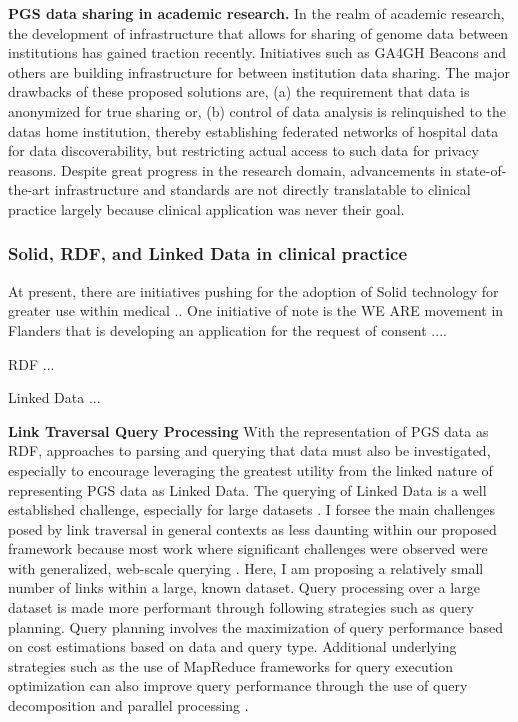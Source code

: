 \documentclass[runningheads]{llncs}
\begin{document}
\textbf{PGS data sharing in academic research.}
In the realm of academic research, the development of infrastructure that allows for sharing of genome data between institutions has gained traction recently. 
Initiatives such as GA4GH Beacons \cite{rambla_beacon_2022} and others are building infrastructure for between institution data sharing. 
The major drawbacks of these proposed solutions are, (a) the requirement that data is anonymized for true sharing or, (b) control of data analysis is relinquished to the data\textquotesingle s home institution, thereby establishing federated networks of hospital data for data discoverability, but restricting actual access to such data for privacy reasons.
Despite great progress in the research domain, advancements in state-of-the-art infrastructure and standards are not directly translatable to clinical practice largely because clinical application was never their goal. 

\subsubsection{Solid, RDF, and Linked Data in clinical practice}
At present, there are initiatives pushing for the adoption of Solid technology for greater use within medical ..
One initiative of note is the WE ARE movement in Flanders that is developing an application for the request of consent ....

RDF ...

Linked Data ...

\textbf{Link Traversal Query Processing}
With the representation of PGS data as RDF, approaches to parsing and querying that data must also be investigated, especially to encourage leveraging the greatest utility from the linked nature of representing PGS data as Linked Data.
The querying of Linked Data is a well established challenge, especially for large datasets \cite{taelman_evaluation_2023}.
I forsee the main challenges posed by link traversal in general contexts as less daunting within our proposed framework because most work where significant challenges were observed were with generalized, web-scale querying \cite{taelman_evaluation_2023}. 
Here, I am proposing a relatively small number of links within a large, known dataset. 
Query processing over a large dataset is made more performant through following strategies such as query planning.
Query planning involves the maximization of query performance based on cost estimations based on data and query type. 
Additional underlying strategies such as the use of MapReduce frameworks for query execution optimization can also improve query performance through the use of query decomposition and parallel processing \cite{shim_mapreduce_2013}.  
\end{document}

